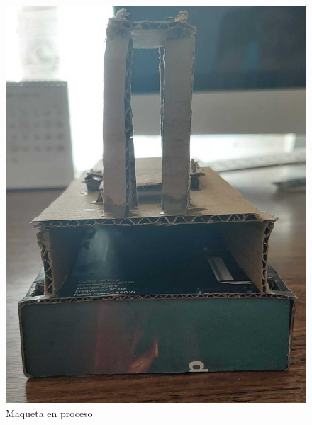 \begin{figure}[ht!]
	\hspace{2cm}
	\begin{minipage}{0.4\linewidth}
		\centering
		\includegraphics[width=\linewidth]{figs/cap5/boceto_carton3.jpeg}
		\caption*{\centering}
	\end{minipage}
	\caption{Maqueta en proceso}
	\label{fig:maqueta1}
\end{figure}

